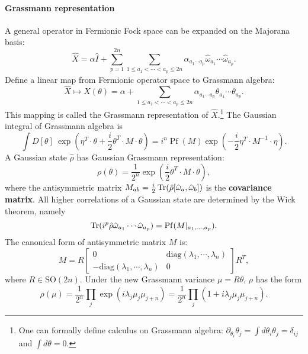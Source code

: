 \documentclass{SciPost}
\begin{document}
\paragraph{Grassmann representation}
A general operator in Fermionic Fock space can be expanded on the Majorana basis:
\begin{equation}
	\hat{X}=\alpha\hat{I}+\sum_{p=1}^{2n}\sum_{1\le a_{1}<\cdots<a_{p}\le2n}\alpha_{a_{1}\cdots a_{p}}\hat{\omega}_{a_{1}}\cdots\hat{\omega}_{a_{p}}.
\end{equation}
Define a linear map from Fermionic operator space to Grassmann algebra:
\begin{equation}
	\hat X \mapsto X(\theta)=\alpha + \sum_{1\le a_{1}<\cdots<a_{p}\le2n}\alpha_{a_{1}\cdots a_{p}}\theta_{a_{1}}\cdots \theta_{a_{p}}.
\end{equation}
This mapping is called the Grassmann representation\cite{bravyi2004lagrangian} of $\hat X$.\footnote{One can formally define calculus on Grassmann algebra: $\partial_{\theta_i} \theta_j = \int d{\theta_i}\theta_j = \delta_{ij}$ and $\int d{\theta}=0$.}
The Gaussian integral of Grassmann algebra is
\begin{equation}
	\int D[\theta]\ \exp\left(\eta^T\cdot\theta+\frac{i}{2}\theta^T \cdot M\cdot\theta \right)
	=i^n \operatorname{Pf}(M) \exp\left(-\frac{i}{2}\eta^T\cdot M^{-1}\cdot\eta \right).
\end{equation}
A Gaussian state $\hat \rho$ has Gaussian Grassmann representation:
\begin{equation}
	\rho(\theta)=\frac{1}{2^{n}}\exp\left(\frac{i}{2}\theta^{T}\cdot M\cdot\theta\right),
\end{equation}
where the antisymmetric matrix $M_{ab}=\frac{i}{2}\operatorname{Tr}(\hat \rho[\hat \omega_a,\hat\omega_b])$ is the \textbf{covariance matrix}.
All higher correlations of a Gaussian state are determined by the Wick theorem, namely
$$
\operatorname{Tr}(i^p\hat\rho\hat\omega_{a_1}\cdots\hat\omega_{a_p})=\operatorname{Pf}(M|_{a_1,\dots,a_p}).
$$
The canonical form of antisymmetric matrix $M$ is:
\begin{equation}
	M = R \begin{bmatrix}
	0 & \mathrm{diag}(\lambda_1,\cdots,\lambda_n) \\ 
	-\mathrm{diag}(\lambda_1,\cdots,\lambda_n) & 0
\end{bmatrix} R^T,
\end{equation}
where $R \in \mathrm{SO}(2n)$.
Under the new Grassmann variance $\mu = R\theta$, $\rho$ has the form
\begin{equation}
	\rho(\mu)
	=\frac{1}{2^{n}}\prod_{j}\exp\left(i\lambda_j\mu_{j} \mu_{j+n}\right)
	=\frac{1}{2^{n}}\prod_{j}\left(1+i\lambda_{j} \mu_{j} \mu_{j+n}\right).
\end{equation}
\end{document}
